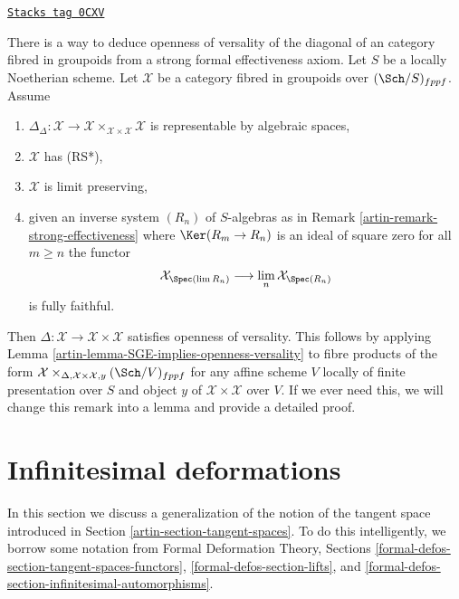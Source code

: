 \begin{remark}
\label{artin-remark-trade-openness-versality-diagonal-with-strong-effectiveness}
\href{https://stacks.math.columbia.edu/tag/0CXV}{\texttt{Stacks tag 0CXV}}

There is a way to deduce openness of versality of the diagonal
of an category fibred in groupoids from a strong formal effectiveness
axiom.
Let $S$ be a locally Noetherian scheme. Let $\mathcal{X}$ be a category fibred
in groupoids over $(\Sch/S)_{fppf}$. Assume
\begin{enumerate}
\item $\Delta_\Delta : \mathcal{X} \to
\mathcal{X} \times_{\mathcal{X} \times \mathcal{X}} \mathcal{X}$
is representable by algebraic spaces,
\item $\mathcal{X}$ has (RS*),
\item $\mathcal{X}$ is limit preserving,
\item given an inverse system $(R_n)$ of $S$-algebras
as in Remark \ref{artin-remark-strong-effectiveness}
where $\Ker(R_m \to R_n)$ is an ideal of square zero for all $m \geq n$
the functor
$$
\mathcal{X}_{\Spec(\lim R_n)} \longrightarrow
\lim_n \mathcal{X}_{\Spec(R_n)}
$$
is fully faithful.
\end{enumerate}
Then $\Delta : \mathcal{X} \to \mathcal{X} \times \mathcal{X}$
satisfies openness of versality. This follows by applying
Lemma \ref{artin-lemma-SGE-implies-openness-versality}
to fibre products of the form
$\mathcal{X} \times_{\Delta, \mathcal{X} \times \mathcal{X}, y}
(\Sch/V)_{fppf}$ for any affine scheme $V$ locally
of finite presentation over $S$ and object $y$ of
$\mathcal{X} \times \mathcal{X}$ over $V$.
If we ever need this, we will change this remark into
a lemma and provide a detailed proof.
\end{remark}

\section{Infinitesimal deformations}
\label{artin-section-inf}
In this section we discuss a generalization of the notion of the
tangent space introduced in Section \ref{artin-section-tangent-spaces}.
To do this intelligently, we borrow some notation from
Formal Deformation Theory, Sections
\ref{formal-defos-section-tangent-spaces-functors},
\ref{formal-defos-section-lifts}, and
\ref{formal-defos-section-infinitesimal-automorphisms}.

